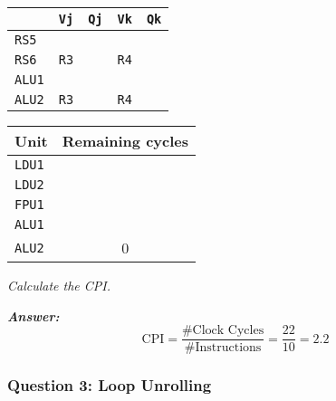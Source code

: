 \begin{enumerate}
    \begin{minipage}{0.45\textwidth}
        \centering
        \begin{tabular}{@{} l | l l l l @{}}
            \toprule
            & \texttt{Vj} & \texttt{Qj} & \texttt{Vk} & \texttt{Qk} \\
            \midrule
            \texttt{RS5} & & & & \\ [.3em]
            \texttt{RS6} & \texttt{R3} & & \texttt{R4} & \\
            \cmidrule{1-5}
            \texttt{ALU1} & & & & \\ [.3em]
            \texttt{ALU2} & \texttt{R3} & & \texttt{R4} & \\
            \bottomrule
        \end{tabular}
    \end{minipage}
    \hfill
    \begin{minipage}{0.45\textwidth}
        \centering
        \begin{tabular}{@{} l c @{}}
            \toprule
            Unit            & Remaining cycles \\
            \midrule
            \texttt{LDU1}   & \\ [.3em]
            \texttt{LDU2}   & \\ [.3em]
            \texttt{FPU1}   & \\ [.3em]
            \texttt{ALU1}   & \\ [.3em]
            \texttt{ALU2}   & 0 \\
            \bottomrule
        \end{tabular}
    \end{minipage}
\end{enumerate}
\emph{Calculate the CPI.}

\highspace
\textcolor{Green3}{\textbf{\emph{Answer:}}}
\begin{equation*}
    \text{CPI} = \dfrac{\text{\# Clock Cycles}}{\text{\# Instructions}} = \dfrac{22}{10} = 2.2
\end{equation*}

\newpage

\subsubsection*{Question 3: Loop Unrolling}


